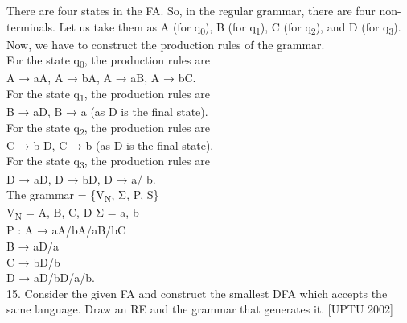 \documentclass[10pt,a4paper]{book}
\begin{document}
There are four states in the FA. So, in the regular grammar, there are four non-terminals.
 Let us take them as A (for q\textsubscript{0}), B (for q\textsubscript{1}), C (for q\textsubscript{2}), and D (for q\textsubscript{3}).\\Now, we have to construct the production rules of the grammar.\\For the state q\textsubscript{0}, the production rules are\\ \hspace*{3cm} A → aA, A → bA, A → aB, A → bC.\\For the state q\textsubscript{1}, the production rules are\\ \hspace*{3cm} B → aD, B → a (as D is the final state).\\ For the state q\textsubscript{2}, the production rules are\\ \hspace*{3cm} C → b D, C → b (as D is the final state).\\For the state q\textsubscript{3}, the production rules are\\ \hspace*{3cm} D → aD, D → bD, D → a/ b.\\The grammar = \{V\textsubscript{N}, Σ, P, S\}\\ \hspace*{3cm}V\textsubscript{N} = {A, B, C, D} Σ = {a, b}\\
 \hspace*{3cm}P : A → aA/bA/aB/bC\\
 \hspace*{3cm}B → aD/a\\
 \hspace*{3cm}C → bD/b\\
 \hspace*{3cm}D → aD/bD/a/b.\\ \newpage
 \hspace*{-1.2cm} 15. Consider the given FA and construct the smallest DFA which accepts the same language. Draw an
RE and the grammar that generates it. \hspace*{1cm}[UPTU 2002]
\end{document}

